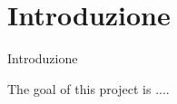 \section{Introduzione}
\begin{frame}{Introduzione}


\begin{minipage}[c]{0.65\textwidth}
The goal of this project is ....
\end{minipage}
\begin{minipage}[c]{0.25\textwidth}
\end{minipage}



\end{frame}


